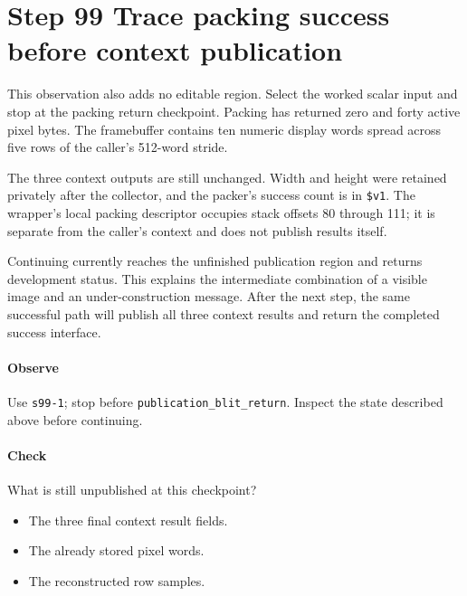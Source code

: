 \section{Step 99 Trace packing success before context publication}
This observation also adds no editable region. Select the worked scalar input and stop at the packing return checkpoint. Packing has returned zero and forty active pixel bytes. The framebuffer contains ten numeric display words spread across five rows of the caller’s 512-word stride.

The three context outputs are still unchanged. Width and height were retained privately after the collector, and the packer’s success count is in \texttt{\$v1}. The wrapper’s local packing descriptor occupies stack offsets 80 through 111; it is separate from the caller’s context and does not publish results itself.

Continuing currently reaches the unfinished publication region and returns development status. This explains the intermediate combination of a visible image and an under-construction message. After the next step, the same successful path will publish all three context results and return the completed success interface.

\paragraph{Observe} Use \texttt{s99-1}; stop before \texttt{publication\_blit\_return}. Inspect the state described above before continuing.

\paragraph{Check} What is still unpublished at this checkpoint?
\begin{itemize}
\item[A.] The three final context result fields.
\item[B.] The already stored pixel words.
\item[C.] The reconstructed row samples.
\end{itemize}
